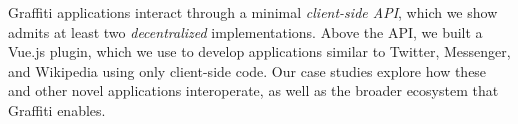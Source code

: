 Graffiti applications interact through a minimal \emph{client-side API},
which we show admits at least two \emph{decentralized} implementations.
Above the API, we built a Vue.js plugin, which we use to
develop applications similar to Twitter, Messenger, and Wikipedia
using only client-side code.
Our case studies explore how these and other novel applications interoperate,
as well as the broader ecosystem that Graffiti enables.
